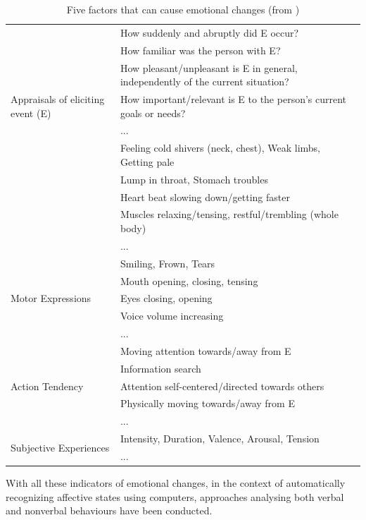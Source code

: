 \begin{table}
\centering
\caption{Five factors that can cause emotional changes (from \cite{scherer2005emotions})}
\label{table:emotion-factors}
\begin{tabular}{| p{4.4cm} | p{10.8cm} |}
\hline
\multirow{7}{4.4cm}{Appraisals of eliciting event (E)} & How suddenly and abruptly did E occur? \\
& How familiar was the person with E? \\
& How pleasant/unpleasant is E in general, independently of the current situation? \\
& How important/relevant is E to the person's current goals or needs? \\ 
& ... \\
\hline
\multirow{5}{4.4cm}{Physiological Symptoms} & Feeling cold shivers (neck, chest), Weak limbs, Getting pale \\
& Lump in throat, Stomach troubles \\
& Heart beat slowing down/getting faster \\
& Muscles relaxing/tensing, restful/trembling (whole body) \\
& ... \\
\hline
\multirow{5}{4.4cm}{Motor Expressions} & Smiling, Frown, Tears \\
& Mouth opening, closing, tensing \\
& Eyes closing, opening \\
& Voice volume increasing \\
& ... \\
\hline
\multirow{5}{4.4cm}{Action Tendency} & Moving attention towards/away from E \\
& Information search \\
& Attention self-centered/directed towards others \\
& Physically moving towards/away from E \\
& ... \\
\hline
\multirow{2}{4.4cm}{Subjective Experiences} & Intensity, Duration, Valence, Arousal, Tension \\
& ... \\
\hline
\end{tabular}
\end{table}

With all these indicators of emotional changes, in the context of automatically recognizing affective states using computers, approaches analysing both verbal and nonverbal behaviours have been conducted.

